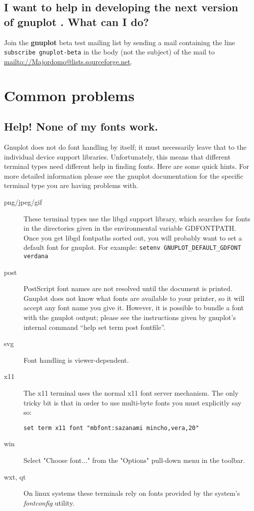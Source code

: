 \documentclass[a4paper,11pt]{article}
\def\mailto#1{{\small\href{mailto://#1}{\url{mailto://#1}}}}
\newcommand{\mailto}[1]%
            {\htmladdnormallink{\latex{\url{<#1>}}\html{\textit{#1}}}%
                {mailto:#1}%
            }
\newcommand{\gnuplot}{\textbf{gnuplot }}
\begin{document}
\subsection{I want to help in developing the next version of \gnuplot.
What can I do?}

Join the \gnuplot beta test mailing list by sending a mail
containing the line
\verb+subscribe gnuplot-beta+
in the body (not the subject) of the mail to
\mailto{Majordomo@lists.sourceforge.net}.


\section{Common problems}


\subsection{Help! None of my fonts work.}

Gnuplot does not do font handling by itself; it must necessarily leave
that to the individual device support libraries. Unfortunately, this
means that different terminal types need different help in finding
fonts. Here are some quick hints. For more detailed information please
see the gnuplot documentation for the specific terminal type you are
having problems with.

\begin{description}
\item [{png/jpeg/gif}] These terminal types use the libgd support library, which
searches for fonts in the directories given in the environmental variable
GDFONTPATH. Once you get libgd fontpaths sorted out, you will probably
want to set a default font for gnuplot.
For example: \verb+setenv GNUPLOT_DEFAULT_GDFONT verdana+
\item [{post}] PostScript font names are not resolved until the document
is printed. Gnuplot does not know what fonts are available to your
printer, so it will accept any font name you give it. However, it
is possible to bundle a font with the gnuplot output; please see the
instructions given by gnuplot's internal command {}``help set term
post fontfile''.
\item [{svg}] Font handling is viewer-dependent.
\item [{x11}] The x11 terminal uses the normal x11 font server mechanism.
The only tricky bit is that in order to use multi-byte fonts you must
explicitly say so:
\small\begin{verbatim}
set term x11 font "mbfont:sazanami mincho,vera,20"
\end{verbatim}\normalsize
\item [{win}] Select "Choose font..." from the "Options" pull-down menu
in the toolbar.
\item [{wxt, qt}] On linux systems these terminals rely on fonts provided
by the system's \textit{fontconfig} utility.
\end{description}
\end{document}
